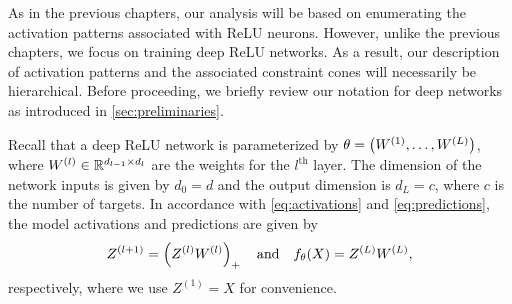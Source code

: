 
As in the previous chapters, our analysis will be based on enumerating
the activation patterns associated with ReLU neurons.
However, unlike the previous chapters, we focus on training deep ReLU networks.
As a result, our description of activation patterns and the associated
constraint cones will necessarily be hierarchical.
Before proceeding, we briefly review our notation for deep networks as
introduced in \cref{sec:preliminaries}.

Recall that a deep ReLU network is
parameterized by \( \theta = \left(W^{(1)}, \ldots, W^{(L)}\right) \), where
\( W^{(l)} \in \mathbb{R}^{d_{l-1} \times d_{l}} \) are the weights for the
\( l^{\text{th}} \) layer.
The dimension of the network inputs is given by \( d_0 = d \) and the output
dimension is \( d_{L} = c \), where \( c \) is the number of targets.
In accordance with \cref{eq:activations} and \cref{eq:predictions}, the model
activations and predictions are given by
\[
    Z^{(l+1)} = \left(Z^{(l)} W^{(l)}\right)_+
    \quad \text{and} \quad
    f_\theta(X) = Z^{(L)} W^{(L)},
\]
respectively, where we use \( Z^{(1)} = X \) for convenience.

